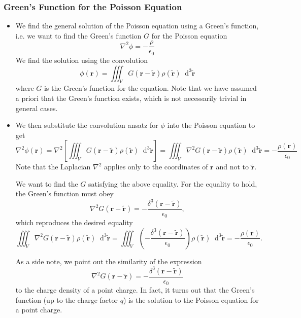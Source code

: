 \documentclass[11pt, a4paper]{article}
\newcommand{\diff}{\mathop{}\!\mathrm{d}} %
\newcommand{\dtr}{\diff^{3} \tilde{\r}}  %
\renewcommand{\vec}[1]{\bm{#1}} %
\renewcommand{\t}[1]{\tilde{#1}} %
\renewcommand{\r}{\vec{r}}
\newcommand{\ee}{\epsilon_{0}}  %
\renewcommand{\laplacian}{\nabla^{2}}
\begin{document}
\subsubsection{Green's Function for the Poisson Equation}
\begin{itemize}
	\item We find the general solution of the Poisson equation using a Green's function, i.e. we want to find the Green's function $ G $ for the Poisson equation
	\begin{equation*}
		\laplacian \phi = - \frac{\rho}{\ee}
	\end{equation*}
	We find the solution using the convolution
	\begin{equation*}
		\phi(\r) = \iiint_{V} G(\r - \t{\r})\rho(\t{\r}) \dtr
	\end{equation*}
	where $ G $ is the Green's function for the equation. Note that we have assumed a priori that the Green's function exists, which is not necessarily trivial in general cases.
	
	
	\item We then substitute the convolution ansatz for $ \phi $ into the Poisson equation to get
	\begin{equation*}
		\laplacian \phi(\r) = \laplacian \left[\iiint_{V}  G(\r - \t{\r})\rho(\t{\r}) \dtr \right] = \iiint_{V} \laplacian G(\r - \t{\r})\rho(\t{\r}) \dtr = - \frac{\rho(\r)}{\ee}
	\end{equation*}
	Note that the Laplacian $ \laplacian $ applies only to the coordinates of $ \r $ and not to $ \t{\r} $.
	
	We want to find the $ G $ satisfying the above equality. For the equality to hold, the Green's function must obey
	\begin{equation*}
		\laplacian G(\r - \t{\r}) = -\frac{\delta^{3}(\r - \t{\r})}{\ee},
	\end{equation*}
	which reproduces the desired equality
	\begin{equation*}
		\iiint_{V} \laplacian G(\r - \t{\r})\rho(\t{\r}) \dtr = \iiint_{V} \left(-\frac{\delta^{3}(\r - \t{\r})}{\ee}\right)\rho(\t{\r}) \dtr =  - \frac{\rho(\r)}{\ee}.
	\end{equation*}
	
	As a side note, we point out the similarity of the expression
	\begin{equation*}
		\laplacian G(\r - \t{\r}) = -\frac{\delta^{3}(\r - \t{\r})}{\ee}
	\end{equation*}
	to the charge density of a point charge. In fact, it turns out that the Green's function (up to the charge factor $ q $) is the solution to the Poisson equation for a point charge. 
	

\end{itemize}
\end{document}
